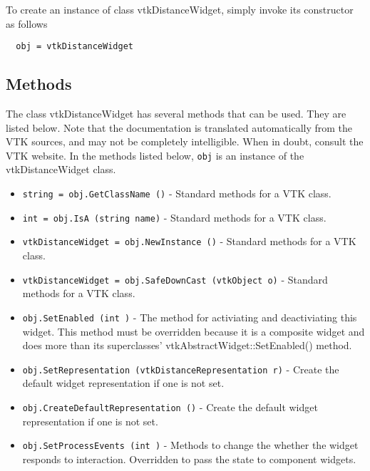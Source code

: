 To create an instance of class vtkDistanceWidget, simply
invoke its constructor as follows
\begin{verbatim}
  obj = vtkDistanceWidget
\end{verbatim}
\subsection{Methods}

The class vtkDistanceWidget has several methods that can be used.
  They are listed below.
Note that the documentation is translated automatically from the VTK sources,
and may not be completely intelligible.  When in doubt, consult the VTK website.
In the methods listed below, \verb|obj| is an instance of the vtkDistanceWidget class.
\begin{itemize}
\item  \verb|string = obj.GetClassName ()| -  Standard methods for a VTK class.

\item  \verb|int = obj.IsA (string name)| -  Standard methods for a VTK class.

\item  \verb|vtkDistanceWidget = obj.NewInstance ()| -  Standard methods for a VTK class.

\item  \verb|vtkDistanceWidget = obj.SafeDownCast (vtkObject o)| -  Standard methods for a VTK class.

\item  \verb|obj.SetEnabled (int )| -  The method for activiating and deactiviating this widget. This method
 must be overridden because it is a composite widget and does more than
 its superclasses' vtkAbstractWidget::SetEnabled() method.

\item  \verb|obj.SetRepresentation (vtkDistanceRepresentation r)| -  Create the default widget representation if one is not set.

\item  \verb|obj.CreateDefaultRepresentation ()| -  Create the default widget representation if one is not set.

\item  \verb|obj.SetProcessEvents (int )| -  Methods to change the whether the widget responds to interaction.
 Overridden to pass the state to component widgets.

\end{itemize}
